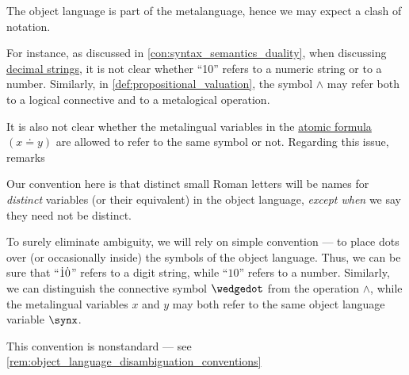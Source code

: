 \begin{remark}\label{rem:object_language_dots}
  The object language is part of the metalanguage, hence we may expect a clash of notation.

  For instance, as discussed in \cref{con:syntax_semantics_duality}, when discussing \hyperref[def:positional_number_system/decimal]{decimal strings}, it is not clear whether \enquote{10} refers to a numeric string or to a number. Similarly, in \cref{def:propositional_valuation}, the symbol \( {\wedge} \) may refer both to a logical connective and to a metalogical operation.

  It is also not clear whether the metalingual variables in the \hyperref[def:first_order_syntax/atomic_formula]{atomic formula} \( (x \doteq y) \) are allowed to refer to the same symbol or not. Regarding this issue,  remarks
  \begin{displayquote}
    Our convention here is that distinct small Roman letters will be names for \textit{distinct} variables (or their equivalent) in the object language, \textit{except when} we say they need not be distinct.
  \end{displayquote}

  To surely eliminate ambiguity, we will rely on simple convention --- to place dots over (or occasionally inside) the symbols of the object language. Thus, we can be sure that \enquote{\( \dot{1}\dot{0} \)} refers to a digit string, while \enquote{\( 10 \)} refers to a number. Similarly, we can distinguish the connective symbol \( {\synwedge} \) from the operation \( {\wedge} \), while the metalingual variables \( x \) and \( y \) may both refer to the same object language variable \( \synx \).
\end{remark}
\begin{comments}
  \item This convention is nonstandard --- see \cref{rem:object_language_disambiguation_conventions}
\end{comments}

